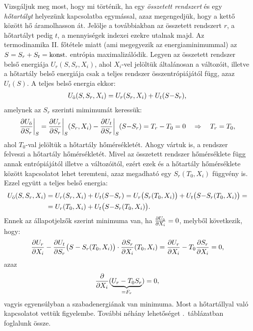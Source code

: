 Vizsgáljuk meg most, hogy mi történik, ha egy \emph{összetett rendszert} és egy \emph{hőtartályt} helyezünk kapcsolatba egymással, azaz megengedjük, hogy a kettő között hő áramolhasson át. Jelölje a továbbiakban az összetett rendszert $r$, a hőtartályt pedig $t$, a mennyiségek indexei ezekre utalnak majd. Az termodinamika II. főtétele miatt (ami megegyezik az energiaminimummal) az $S=S_r+S_t = \textnormal{konst.}$ entrópia maximalizálódik. Legyen az összetett rendszer belső energiája $U_r(S,S_r,X_i)$, ahol $X_i$-vel jelöltük általánosan a változóit, illetve a hőtartály belső energiája csak a teljes rendszer összentrópiájától függ, azaz $U_t(S)$. A teljes belső energia ekkor:
\begin{align}
	U_{\textnormal{ö}}(S,S_r,X_i) = U_r(S_r,X_i) + U_t(S{-}S_r),
\end{align}
amelynek az $S_r$ szerinti mimimumát keressük:
\begin{align}
	\frac{\partial{U_{\textnormal{ö}}}}{\partial{S_r}}\bigg|_S=\frac{\partial{U_r}}{\partial{S_r}}\bigg|_S(S_r,X_i) - \frac{\partial{U_t}}{\partial{S_r}}\bigg|_S(S{-}S_r) = T_r-T_0 = 0\quad\Rightarrow\quad T_r=T_0,
\end{align}
ahol $T_0$-val jelöltük a hőtartály hőmérsékletét. Ahogy vártuk is, a rendszer felveszi a hőtartály hőmérsékletét. Mivel az összetett rendszer hőmérséklete függ annak entrópiájától illetve a változóitól, ezért ezek és a hőtartály hőmérséklete között kapcsolatot lehet teremteni, azaz megadható egy $S_r(T_0,X_i)$ függvény is. Ezzel együtt a teljes belső energia:
\begin{align}
\begin{split}
	U_{\textnormal{ö}} (S,S_r,X_i) &= U_r(S_r,X_i) + U_t(S{-}S_r) = U_r\big(S_r(T_0,X_i)\big) + U_t\big(S{-}S_r(T_0,X_i)\big) =\\
	&= U_r(T_0,X_i) +U_t\big(S{-}S_r(T_0,X_i)\big).
\end{split}
\end{align}
Ennek az állapotjelzők szerint minimuma van, ha $\frac{\partial{U_{\textnormal{ö}}}}{\partial{X_i}}=0$, melyből következik, hogy:
\begin{align}
	\frac{\partial{U_r}}{\partial{X_i}}-\frac{\partial{U_t}}{\partial{S_r}}\big(S-S_r(T_0,X_i)\big)\cdot \frac{\partial{S_r}}{\partial{X_i}}(T_0,X_i) = \frac{\partial{U_r}}{\partial{X_i}}-T_0\frac{\partial{S_r}}{\partial{X_i}}=0,
\end{align}
azaz
\begin{align}
	\frac{\partial{}}{\partial{X_i}}(\underbrace{U_r-T_0S_r}_{=F_r})=0,
\end{align}
vagyis egyensúlyban a szabadenergiának van minimuma. Most a hőtartállyal való kapcsolatot vettük figyelembe. További néhány lehetőséget .\ táblázatban foglalunk össze.
